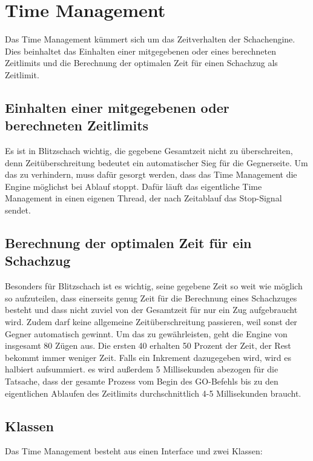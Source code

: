 \def \citeuci[#1]{\cite[l. #1]{uci}}
\section{Time Management}\label{sec:timeMan}
Das Time Management kümmert sich um das Zeitverhalten der Schachengine. Dies beinhaltet
das Einhalten einer mitgegebenen oder eines berechneten Zeitlimits und die Berechnung der optimalen Zeit für einen Schachzug als Zeitlimit.

\subsection{Einhalten einer mitgegebenen oder berechneten Zeitlimits}
Es ist in Blitzschach wichtig, die gegebene Gesamtzeit nicht zu überschreiten, denn Zeitüberschreitung bedeutet ein automatischer Sieg für die Gegnerseite. 
\newline Um das zu verhindern, muss dafür gesorgt werden, dass das Time Management die Engine möglichst bei Ablauf stoppt. Dafür läuft das eigentliche Time Management in einen eigenen Thread, der nach Zeitablauf das Stop-Signal sendet. 

\subsection{Berechnung der optimalen Zeit für ein Schachzug}
Besonders für Blitzschach ist es wichtig, seine gegebene Zeit so weit wie möglich so aufzuteilen, dass einerseits genug Zeit für die Berechnung eines Schachzuges besteht und dass nicht zuviel von der Gesamtzeit für nur ein Zug aufgebraucht wird. Zudem darf keine allgemeine Zeitüberschreitung passieren, weil sonst der Gegner automatisch gewinnt. 
\newline Um das zu gewährleisten, geht die Engine von insgesamt 80 Zügen aus. Die ersten 40 erhalten 50 Prozent der Zeit, der Rest bekommt immer weniger Zeit. Falls ein Inkrement dazugegeben wird, wird es halbiert aufsummiert. 
\newline es wird außerdem 5 Millisekunden abezogen f\"ur die Tatsache, dass der gesamte Prozess vom Begin des GO-Befehls bis zu den eigentlichen Ablaufen des Zeitlimits durchschnittlich 4-5 Millisekunden braucht.

\subsection{Klassen}
Das Time Management besteht aus einen Interface und zwei Klassen:

